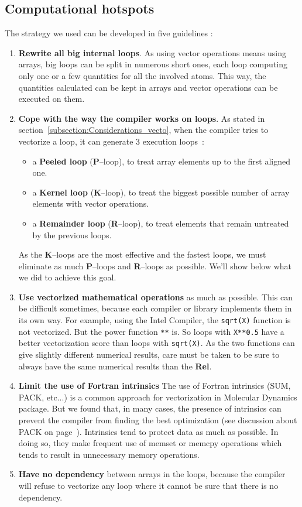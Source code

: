 \documentclass[9pt,comparison]{livecoms}
\newcommand{\lv}{\Large\verb}
\begin{document}
\subsection{Computational hotspots}
\hspace{\parindent}The strategy we used can be developed in five guidelines : 
\begin{enumerate}
    \item \textbf{Rewrite all big internal loops}. As using vector operations means using arrays, big loops can be split in numerous short ones, each loop computing only one or a few quantities for all the involved atoms. This way, the quantities calculated can be kept in arrays and vector operations can be executed on them.
    \item \textbf{Cope with the way the compiler works on loops}. As stated in section~\ref{subsection:Considerations_vecto}, when the compiler tries to vectorize a loop, it can generate 3 execution loops~:
    \begin{itemize}
        \item a \textbf{Peeled loop} (\textbf{P}--loop), to treat array elements up to the first aligned one. 
        \item a \textbf{Kernel loop} (\textbf{K}--loop), to treat the biggest possible number of array elements with vector operations.
        \item a \textbf{Remainder loop} (\textbf{R}--loop), to treat elements that remain untreated by the previous loops.
    \end{itemize}
    As the \textbf{K}--loops are the most effective and the fastest loops, we must eliminate as much \textbf{P}--loops and \textbf{R}--loops as possible. We'll show below  what we did to achieve this goal.
    
    \item \textbf{Use vectorized mathematical operations} as much as possible. This can be difficult sometimes, because each compiler or library  implements them in its own way. For example, using the Intel Compiler, the {\color{blue}\lv|sqrt(X)|} function is not vectorized. But the power function {\color{blue}\lv|**|} is. So loops with {\color{blue}\lv|X**0.5|} have a better vectorization score than loops with {\color{blue}\lv|sqrt(X)|}. As the two functions can give slightly different numerical results, care must be taken to be sure to always have the same numerical results than the {\bf Rel}. %
    \item \textbf{Limit the use of Fortran intrinsics} The use of Fortran intrinsics (SUM, PACK, etc...) is a common approach for vectorization in Molecular Dynamics package. But we found that, in many cases, the presence of intrinsics can prevent the compiler from finding the best optimization (see discussion about PACK on page~\pageref{PACK}). Intrinsics tend to protect data as much as possible. In doing so, they make frequent use of memset or memcpy operations which tends to result in unnecessary memory operations.
    \item \textbf{Have no dependency} between arrays in the loops, because the compiler will refuse to vectorize any loop where it cannot be sure that there is no dependency.
    

\end{enumerate}
\end{document}

